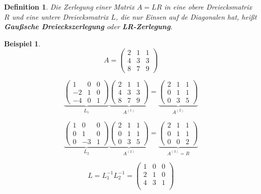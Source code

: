 \documentclass[a4paper,10pt]{article}
\newtheorem[L]{satz}{Satz}[section]
\newtheorem{definition}{Definition}[section]
\newtheorem{bsp}{Beispiel}[section]
\newtheorem[S]{beweis}{Beweis}
\newtheorem[S]{beh}{Behauptung}
\begin{document}
\begin{definition}
  Die Zerlegung einer Matrix $A = LR$ in eine obere Dreiecksmatrix $R$ und eine untere Dreiecksmatrix $L$, die nur Einsen auf de Diagonalen hat, heißt \textbf{Gaußsche Dreieckszerlegung} oder \textbf{LR-Zerlegung}.
\end{definition}

\begin{bsp}
  \[
    A = \begin{pmatrix}
          2 & 1 & 1 \\
          4 & 3 & 3 \\
          8 & 7 & 9
        \end{pmatrix}
  \]

  \[
    \underbrace{\begin{pmatrix}
      1 & 0 & 0 \\
      -2 & 1 & 0 \\
      -4 & 0 & 1
    \end{pmatrix}}_{L_1}
    \underbrace{\begin{pmatrix}
      2 & 1 & 1 \\
      4 & 3 & 3 \\
      8 & 7 & 9
    \end{pmatrix}}_{A^{(1)}}
    =
    \underbrace{\begin{pmatrix}
      2 & 1 & 1 \\
      0 & 1 & 1 \\
      0 & 3 & 5
    \end{pmatrix}}_{A^{(2)}}
  \]

  \[
    \underbrace{\begin{pmatrix}
      1 & 0 & 0 \\
      0 & 1 & 0 \\
      0 & -3 & 1
    \end{pmatrix}}_{L_2}
    \underbrace{\begin{pmatrix}
      2 & 1 & 1 \\
      0 & 1 & 1 \\
      0 & 3 & 5
    \end{pmatrix}}_{A^{(2)}}
    =
    \underbrace{\begin{pmatrix}
      2 & 1 & 1 \\
      0 & 1 & 1 \\
      0 & 0 & 2
    \end{pmatrix}}_{A^{(3)}=R}
  \]

  \[
    L = L_1^{-1} L_2^{-1} =
      \begin{pmatrix}
        1 & 0 & 0 \\
        2 & 1 & 0 \\
        4 & 3 & 1 \\
      \end{pmatrix}
  \]


\end{bsp}
\end{document}
